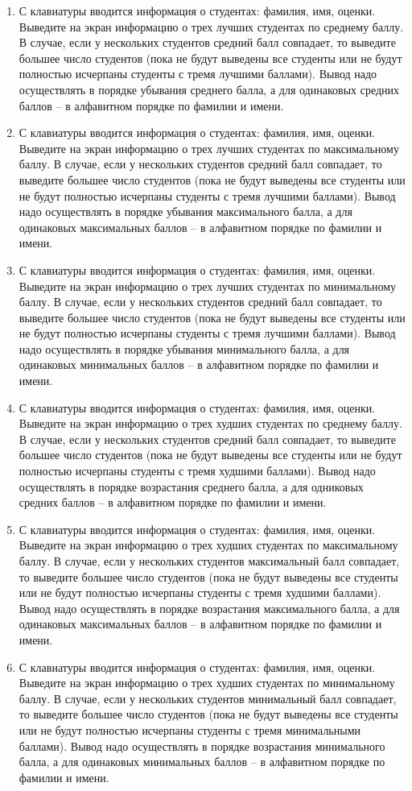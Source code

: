 \begin{enumerate}
	\item С клавиатуры вводится информация о студентах: фамилия, имя, оценки. Выведите на экран информацию о трех лучших студентах по среднему баллу. В случае,
		если у нескольких студентов средний балл совпадает, то выведите большее число студентов (пока не будут выведены все студенты или 
		не будут полностью исчерпаны студенты с тремя лучшими баллами). Вывод надо осуществлять в порядке убывания среднего балла, а 
		для одинаковых средних баллов -- в алфавитном порядке по фамилии и имени.
	\item С клавиатуры вводится информация о студентах: фамилия, имя, оценки. Выведите на экран информацию о трех лучших студентах по максимальному баллу. В случае,
		если у нескольких студентов средний балл совпадает, то выведите большее число студентов (пока не будут выведены все студенты или 
		не будут полностью исчерпаны студенты с тремя лучшими баллами). Вывод надо осуществлять в порядке убывания максимального балла, а 
		для одинаковых максимальных баллов -- в алфавитном порядке по фамилии и имени.
	\item С клавиатуры вводится информация о студентах: фамилия, имя, оценки. Выведите на экран информацию о трех лучших студентах по минимальному баллу. В случае,
		если у нескольких студентов средний балл совпадает, то выведите большее число студентов (пока не будут выведены все студенты или 
		не будут полностью исчерпаны студенты с тремя лучшими баллами). Вывод надо осуществлять в порядке убывания минимального балла, а 
		для одинаковых минимальных баллов -- в алфавитном порядке по фамилии и имени.
	\item С клавиатуры вводится информация о студентах: фамилия, имя, оценки. Выведите на экран информацию о трех худших студентах по среднему баллу. В случае,
		если у нескольких студентов средний балл совпадает, то выведите большее число студентов (пока не будут выведены все студенты или 
		не будут полностью исчерпаны студенты с тремя худшими баллами). Вывод надо осуществлять в порядке возрастания среднего балла, а 
		для одниковых средних баллов -- в алфавитном порядке по фамилии и имени.
	\item С клавиатуры вводится информация о студентах: фамилия, имя, оценки. Выведите на экран информацию о трех худших студентах по максимальному баллу. В случае,
		если у нескольких студентов максимальный балл совпадает, то выведите большее число студентов (пока не будут выведены все студенты или 
		не будут полностью исчерпаны студенты с тремя худшими баллами). Вывод надо осуществлять в порядке возрастания максимального балла, а 
		для одинаковых максимальных баллов -- в алфавитном порядке по фамилии и имени.
	\item С клавиатуры вводится информация о студентах: фамилия, имя, оценки. Выведите на экран информацию о трех худших студентах по минимальному баллу. В случае,
		если у нескольких студентов минимальный балл совпадает, то выведите большее число студентов (пока не будут выведены все студенты или 
		не будут полностью исчерпаны студенты с тремя минимальными баллами). Вывод надо осуществлять в порядке возрастания минимального балла, а 
		для одинаковых минимальных баллов -- в алфавитном порядке по фамилии и имени.


\end{enumerate}
